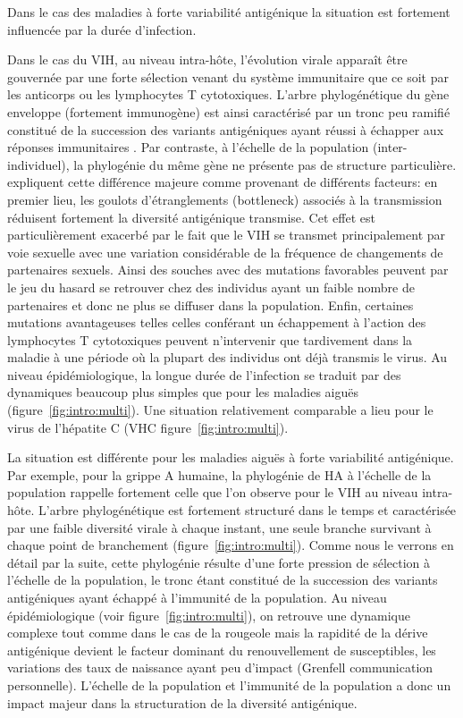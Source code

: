 Dans le cas des maladies à forte variabilité antigénique la situation
est fortement influencée par la durée d'infection.

Dans le cas du VIH, au niveau intra-hôte, l'évolution virale apparaît
être gouvernée par une forte sélection venant du système immunitaire
que ce soit par les anticorps ou les lymphocytes T cytotoxiques.
L'arbre phylogénétique du gène enveloppe (fortement immunogène) est
ainsi caractérisé par un tronc peu ramifié constitué de la succession
des variants antigéniques ayant réussi à échapper aux réponses
immunitaires \citep{Rambaut2004}. Par contraste, à l'échelle de la
population (inter-individuel), la phylogénie du même gène ne présente
pas de structure particulière. \citet{Rambaut2004} expliquent cette
différence majeure comme provenant de différents facteurs: en premier
lieu, les goulots d'étranglements (bottleneck) associés à la
transmission réduisent fortement la diversité antigénique transmise.
Cet effet est particulièrement exacerbé par le fait que le VIH se
transmet principalement par voie sexuelle avec une variation
considérable de la fréquence de changements de partenaires sexuels.
Ainsi des souches avec des mutations favorables peuvent par le jeu du
hasard se retrouver chez des individus ayant un faible nombre de
partenaires et donc ne plus se diffuser dans la population. Enfin,
certaines mutations avantageuses telles celles conférant un
échappement à l'action des lymphocytes T cytotoxiques peuvent
n'intervenir que tardivement dans la maladie à une période où la
plupart des individus ont déjà transmis le virus. Au niveau
épidémiologique, la longue durée de l'infection se traduit par des
dynamiques beaucoup plus simples que pour les maladies aiguës
(figure~\ref{fig:intro:multi}). Une situation relativement comparable
a lieu pour le virus de l'hépatite C (VHC
figure~\ref{fig:intro:multi}).

La situation est différente pour les maladies aiguës à forte
variabilité antigénique. Par exemple, pour la grippe A humaine, la
phylogénie de HA à l'échelle de la population rappelle fortement celle
que l'on observe pour le VIH au niveau intra-hôte. L'arbre
phylogénétique est fortement structuré dans le temps et caractérisée
par une faible diversité virale à chaque instant, une seule branche
survivant à chaque point de branchement
(figure~\ref{fig:intro:multi}). Comme nous le verrons en détail par la
suite, cette phylogénie résulte d'une forte pression de sélection à
l'échelle de la population, le tronc étant constitué de la succession
des variants antigéniques ayant échappé à l'immunité de la population.
Au niveau épidémiologique (voir figure~\ref{fig:intro:multi}), on
retrouve une dynamique complexe tout comme dans le cas de la rougeole
mais la rapidité de la dérive antigénique devient le facteur dominant
du renouvellement de susceptibles, les variations des taux de
naissance ayant peu d'impact (Grenfell communication personnelle).
L'échelle de la population et l'immunité de la population a donc un
impact majeur dans la structuration de la diversité antigénique.

